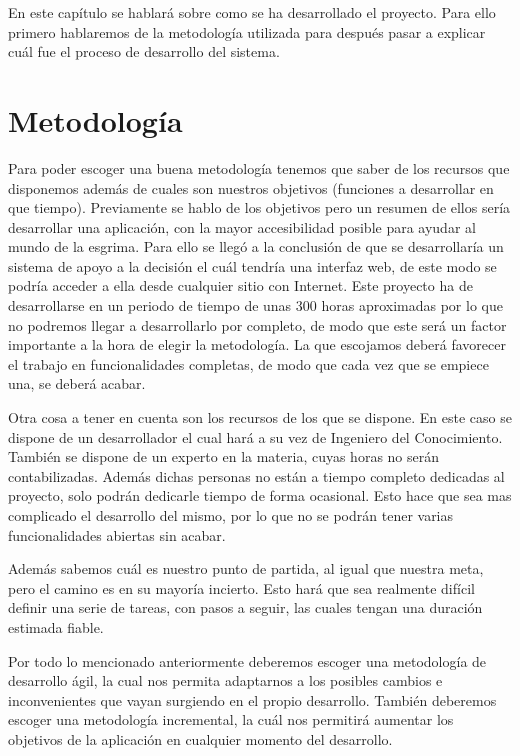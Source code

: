 En este capítulo se hablará sobre como se ha desarrollado el proyecto. Para ello primero hablaremos
de la metodología utilizada para después pasar a explicar cuál fue el proceso de desarrollo del sistema.

\section{Metodología}

Para poder escoger una buena metodología tenemos que saber de los recursos que disponemos además
de cuales son nuestros objetivos (funciones a desarrollar en que tiempo). Previamente se hablo
de los objetivos pero un resumen de ellos sería desarrollar una aplicación, con la mayor
accesibilidad posible para ayudar al mundo de la esgrima. Para ello se llegó a la conclusión de que
se desarrollaría un sistema de apoyo a la decisión el cuál tendría una interfaz web, de este modo
se podría acceder a ella desde cualquier sitio con Internet. Este proyecto ha de desarrollarse
en un periodo de tiempo de unas 300 horas aproximadas por lo que no podremos llegar a
desarrollarlo por completo, de modo que este será un factor importante a la hora de elegir la metodología.
La que escojamos deberá favorecer el trabajo en funcionalidades completas, de modo que cada vez
que se empiece una, se deberá acabar.

Otra cosa a tener en cuenta son los recursos de los que se dispone. En este caso se dispone de
un desarrollador el cual hará a su vez de Ingeniero del Conocimiento. También se dispone de un
experto en la materia, cuyas horas no serán contabilizadas. Además dichas personas no están a tiempo
completo dedicadas al proyecto, solo podrán dedicarle tiempo de forma ocasional. Esto hace que sea
mas complicado el desarrollo del mismo, por lo que no se podrán tener varias funcionalidades abiertas
sin acabar.

Además sabemos cuál es nuestro punto de partida, al igual que nuestra meta, pero el camino es
en su mayoría incierto. Esto hará que sea realmente difícil definir una serie de tareas, con
pasos a seguir, las cuales tengan una duración estimada fiable.

Por todo lo mencionado anteriormente deberemos escoger una metodología de desarrollo ágil, la cual
nos permita adaptarnos a los posibles cambios e inconvenientes que vayan surgiendo en el propio
desarrollo. También deberemos escoger una metodología incremental, la cuál nos permitirá aumentar
los objetivos de la aplicación en cualquier momento del desarrollo.
